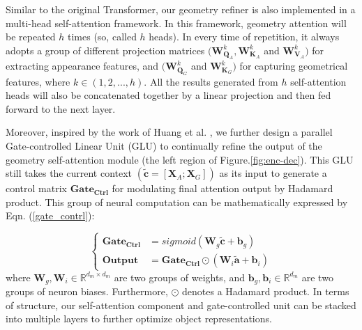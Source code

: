 \documentclass[review]{elsarticle}
\begin{document}
Similar to the original Transformer\cite{vaswani2017attention}, our geometry refiner is also implemented in a multi-head self-attention framework. In this framework, geometry attention will be repeated \(h\) times (so, called \(h\) heads). In every time of repetition, it always adopts a group of different projection matrices $(\bm{W}_{\bm{Q}_{A}}^{k}, \bm{W}_{\bm{K}_{A}}^{k}$ and $\bm{W}_{\bm{V}_{A}}^k)$ for extracting appearance features, and $(\bm{W}_{\bm{Q}_{G}}^{k}$ and $\bm{W}_{\bm{K}_{G}}^{k})$ for capturing geometrical features, where \(k\in(1,2,...,h)\). All the results generated from \(h\) self-attention heads will also be concatenated together by a linear projection and then fed forward to the next layer.


Moreover, inspired by the work of Huang et al. \cite{huang2019attention}, we further design a parallel Gate-controlled Linear Unit (GLU) to continually refine the output of the geometry self-attention module (the left region of Figure.\ref{fig:enc-dec}). This GLU still takes the current context $(\bm{\tilde{c}} = [\bm{X}_A; \bm{X}_G])$ as its input to generate a control matrix \(\bm{Gate_{Ctrl}}\) for modulating final attention output by Hadamard product. This group of neural computation can be mathematically expressed by Eqn. (\ref{gate_contrl}):

\begin{equation}
\left\{
\begin{aligned}
\bm{Gate_{Ctrl}} &=sigmoid(\bm{W}_{g}\bm{\tilde{c}} + \bm{b}_g) \\
\bm{Output} &= \bm{Gate_{Ctrl}} \odot (\bm{W}_{i}\bm{\tilde{a}} + \textbf{b}_{i})
\end{aligned} \right.
\label{gate_contrl}
\end{equation}
where \(\bm{W}_{g}, \bm{W}_{i}\in \mathbb{R}^{d_{m} \times d_{m}}\) are two groups of weights, and \(\bm{b}_g, \bm{b}_{i} \in \mathbb{R}^{d_{m}}\) are two groups of neuron biases. Furthermore, \(\odot\) denotes a Hadamard product. In terms of structure, our self-attention component and gate-controlled unit can be stacked into multiple layers to further optimize object representations.
\end{document}
